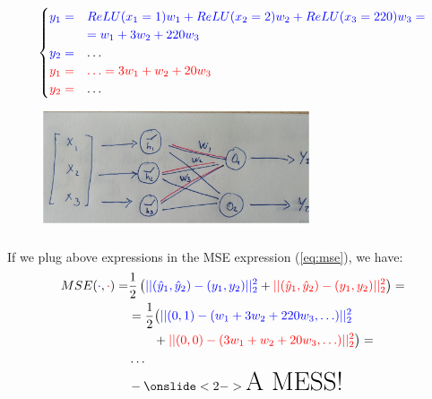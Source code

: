 \documentclass{beamer}
\begin{document}
\begin{frame}
    \frametitle{\insertsection}
    \framesubtitle{\insertsubsection}

    \begin{equation*}
        \begin{cases}
            \color{blue}y_1 =& \color{blue}ReLU(x_1=1)w_1+ReLU(x_2=2)w_2+ReLU(x_3=220)w_3 =\\
                             &\color{blue}= w_1 + 3w_2 + 220w_3\\
            \color{blue}y_2=& \ldots\\
            \color{red}y_1 =&\color{red} \ldots = 3w_1 + w_2 + 20w_3\\
            \color{red}y_2=& \ldots
        \end{cases}
    \end{equation*}

    \begin{figure}
        \centering
        \includegraphics[width=0.7\textwidth]{img/nn-relu.jpg}
        \caption{}
        \label{fig:nn-relu}
    \end{figure}
\end{frame}





\begin{frame}
    \frametitle{\insertsection}
    \framesubtitle{\insertsubsection}

    If we plug above expressions in the MSE expression (\ref{eq:mse}), we have:
    \begin{align*}
    MSE({\color{blue} \cdot}, {\color{red}\cdot})=& \frac{1}{2}\left( {\color{blue} || (\hat{y}_1, \hat{y}_2) - (y_1,y_2) ||_2^2} + {\color{red}|| (\hat{y}_1, \hat{y}_2) - (y_1,y_2) ||_2^2 } \right)=\\
                                                  &= \frac{1}{2} \big( {\color{blue}|| (0,1)-(w_1+3w_2+220w_3, \ldots) ||_2^2}\\
                                                  & \qquad + {\color{red}|| (0,0) - (3w_1+w_2+20w_3,\ldots) ||_2^2}\big) =\\
                                                  & \ldots \\
                                                  &- \onslide<2->{\text{\huge A MESS!}}
    \end{align*}
\end{frame}
\end{document}
